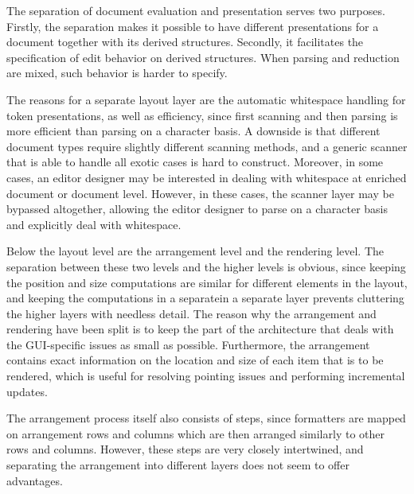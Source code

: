 The separation of document evaluation and presentation serves two purposes. Firstly, the separation makes it possible to have different presentations for a document together with its derived structures. Secondly, it facilitates the specification of edit behavior on derived structures. When parsing and reduction are mixed, such behavior is harder to specify.

The reasons for a separate layout layer are the automatic whitespace handling for token presentations, as well as efficiency, since first scanning and then parsing is more efficient than parsing on a character basis. A downside is that different document types require slightly different scanning methods, and a generic scanner that is able to handle all exotic cases is hard to construct. Moreover, in some cases, an editor designer may be interested in dealing with whitespace at enriched document or document level. However, in these cases, the scanner layer may be bypassed altogether, allowing the editor designer to parse on a character basis and explicitly deal with whitespace.

Below the layout level are the arrangement level and the rendering level. The separation between these two levels and the higher levels is obvious, since keeping the position and size computations \bc are similar for different elements in the layout, and keeping the computations in a separate\ec in a separate layer prevents cluttering the higher layers with needless detail. The reason why the arrangement and rendering have been split is to keep the part of the architecture that deals with the GUI-specific issues as small as possible. Furthermore, the arrangement contains exact information on the location and size of each item that is to be rendered, which is useful for resolving pointing issues and performing incremental updates. 

The arrangement process itself also consists of steps, since formatters are mapped on arrangement rows and columns which are then arranged similarly to other rows and columns. However, these steps are very closely intertwined, and separating the arrangement into different layers does not seem to offer advantages. 

